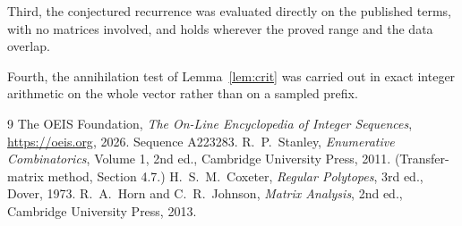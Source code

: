 \documentclass[11pt,a4paper]{article}
\theoremstyle{plain}
\theoremstyle{definition}
\begin{document}
Third, the conjectured recurrence was evaluated directly on the published terms, with no
matrices involved, and holds wherever the proved range and the data overlap.

Fourth, the annihilation test of Lemma~\ref{lem:crit} was carried out in exact integer
arithmetic on the whole vector rather than on a sampled prefix.

\begin{thebibliography}{9}
 The OEIS Foundation, \emph{The On-Line Encyclopedia of Integer
Sequences}, \url{https://oeis.org}, 2026. Sequence A223283.
 R.~P.~Stanley, \emph{Enumerative Combinatorics}, Volume 1, 2nd ed.,
Cambridge University Press, 2011. (Transfer-matrix method, Section 4.7.)
 H.~S.~M.~Coxeter, \emph{Regular Polytopes}, 3rd ed., Dover, 1973.
 R.~A.~Horn and C.~R.~Johnson, \emph{Matrix Analysis}, 2nd ed., Cambridge
University Press, 2013.
\end{thebibliography}
\end{document}
